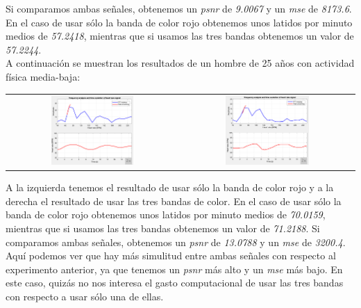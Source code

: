 \documentclass[11pt]{article}
\begin{document}
Si comparamos ambas señales, obtenemos un \textit{psnr} de \textit{9.0067} y un \textit{mse} de \textit{8173.6}. En el caso de usar sólo la banda de color rojo obtenemos unos latidos por minuto medios de \textit{57.2418}, mientras que si usamos las tres bandas obtenemos un valor de \textit{57.2244}. \\

A continuación se muestran los resultados de un hombre de 25 años con actividad física media-baja:

\begin{table}[H]
	\centering
	\begin{tabular}{cc}
		\includegraphics[width=0.5\textwidth]{images/sujeto1_R.png} & \includegraphics[width=0.5\textwidth]{images/sujeto1_RGB.png}
	\end{tabular}
\end{table}

A la izquierda tenemos el resultado de usar sólo la banda de color rojo y a la derecha el resultado de usar las tres bandas de color. En el caso de usar sólo la banda de color rojo obtenemos unos latidos por minuto medios de \textit{70.0159}, mientras que si usamos las tres bandas obtenemos un valor de \textit{71.2188}. Si comparamos ambas señales, obtenemos un \textit{psnr} de \textit{13.0788} y un \textit{mse} de \textit{3200.4}. Aquí podemos ver que hay más simulitud entre ambas señales con respecto al experimento anterior, ya que tenemos un \textit{psnr} más alto y un \textit{mse} más bajo. En este caso, quizás no nos interesa el gasto computacional de usar las tres bandas con respecto a usar sólo una de ellas. \\
\end{document}
